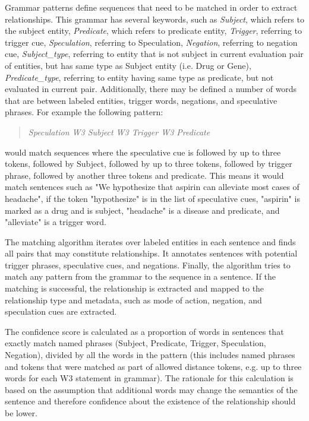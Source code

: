 \documentclass[final,12pt,3p,times,twocolumn,authoryear]{elsarticle}
\begin{document}
Grammar patterns define sequences that need to be matched in order to extract relationships. This grammar has several keywords, such as \textit{Subject}, which refers to the subject entity, \textit{Predicate}, which refers to predicate entity, \textit{Trigger}, referring to trigger cue, \textit{Speculation}, referring to Speculation, \textit{Negation}, referring to negation cue, \textit{Subject\_type}, referring to entity that is not subject in current evaluation pair of entities, but has same type as Subject entity (i.e. Drug or Gene), \textit{Predicate\_type}, referring to entity having same type as predicate, but not evaluated in current pair. Additionally, there may be defined a number of words that are between labeled entities, trigger words, negations, and speculative phrases. For example the following pattern: 


\begin{quote}
\textit{Speculation W3 Subject W3 Trigger W3 Predicate}
\end{quote}

would match sequences where the speculative cue is followed by up to three tokens, followed by Subject, followed by up to three tokens, followed by trigger phrase, followed by another three tokens and predicate. This means it would match sentences such as "We hypothesize that aspirin can alleviate most cases of headache", if the token "hypothesize" is in the list of speculative cues, "aspirin" is marked as a drug and is subject, "headache" is a disease and predicate, and "alleviate" is a trigger word. 

The matching algorithm iterates over labeled entities in each sentence and finds all pairs that may constitute relationships. It annotates sentences with potential trigger phrases, speculative cues, and negations. Finally, the algorithm tries to match any pattern from the grammar to the sequence in a sentence. If the matching is successful, the relationship is extracted and mapped to the relationship type and metadata, such as mode of action, negation, and speculation cues are extracted. 

The confidence score is calculated as a proportion of words in sentences that exactly match named phrases (Subject, Predicate, Trigger, Speculation, Negation), divided by all the words in the pattern (this includes named phrases and tokens that were matched as part of allowed distance tokens, e.g. up to three words for each W3 statement in grammar). The rationale for this calculation is based on the assumption that additional words may change the semantics of the sentence and therefore confidence about the existence of the relationship should be lower. 
\end{document}
